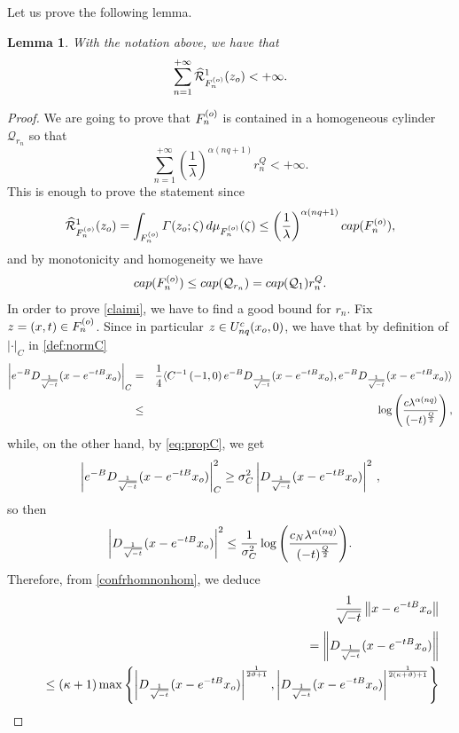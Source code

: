 \documentclass{amsart}
\newtheorem{lemma}[thm]{Lemma}
\numberwithin{equation}{section}
\def \balayage{{\widehat{\mathcal{R}}}}
\renewcommand{\Gamma}{\varGamma}
\begin{document}
{Let us prove the following lemma.
\begin{lemma}%
With the notation above, we have that
\[
\sum_{n=1}^{+\infty}{\balayage^1_{F_n^{( {\rm o})}}(z_{\rm o})}<+\infty.
\]
\end{lemma}
\begin{proof}
We are going to prove that $F_n^{( {\rm o})}$ is contained in a homogeneous cylinder $\mathcal{Q}_{r_n}$ so that
\begin{equation}\label{claimi}
\sum_{n=1}^{+\infty}{\left(\frac{1}{\lambda}\right)^{\alpha(nq+1)}r_n^Q}<+\infty.
\end{equation}
This is enough to prove the statement since
\[
\balayage^1_{F_n^{( {\rm o})}}(z_{\rm o})=\int_{F_n^{( {\rm o})}}{\Gamma(z_{\rm o};\zeta)\,\rm{d}\mu_{F_n^{( {\rm o})}}(\zeta)}\leq\left(\frac{1}{\lambda}\right)^{\alpha(nq+1)}\textup{cap} (F_n^{( {\rm o})}),
\]
and by monotonicity and homogeneity we have 
\[
\textup{cap} (F_n^{( {\rm o})})\leq \textup{cap} (\mathcal{Q}_{r_n})= \textup{cap} (\mathcal{Q}_{1}) r_n^Q.
\]
In order to prove \eqref{claimi}, we have to find a good bound for $r_n$. Fix $z=(x,t)\in F_n^{( {\rm o})}$. Since in particular $z\in U_{nq}^c(x_{\rm o},0)$, we have that by definition of $|\cdot|_C$ in \eqref{def:normC}
\begin{eqnarray*}
\left|e^{-B}D_{\frac{1}{\sqrt{-t}}}(x-e^{-t B}x_{\rm o})\right|_C & = &   \frac{1}{4}\langle C^{-1}\left(-1,0\right)e^{-B}D_{\frac{1}{\sqrt{-t}}}(x-e^{-tB}x_{\rm o}),e^{-B}D_{\frac{1}{\sqrt{-t}}}(x-e^{-tB}x_{\rm o})\rangle\notag\\
& \leq & 
\log{\left(\frac{c\lambda^{\alpha(nq)}}{(-t)^{\frac{Q}{2}}}\right)}\,,
\end{eqnarray*}
while, on the other hand, by \eqref{eq:propC}, we get
\[
    \left|e^{-B}D_{\frac{1}{\sqrt{-t}}}(x-e^{-tB}x_{\rm o})\right|_C^2 \geq  
 \sigma^2_C \left|D_{\frac{1}{\sqrt{-t}}}(x-e^{-tB}x_{\rm o})\right|^2\,,
\]
so then
\begin{equation}\label{boundM}
\left|D_{\frac{1}{\sqrt{-t}}}(x-e^{-tB}x_{\rm o})\right|^2\leq\frac{1}{\sigma^2_C }\log{\left(\frac{c_N\lambda^{\alpha(nq)}}{(-t)^{\frac{Q}{2}}}\right)}.
\end{equation} 
Therefore, from \eqref{confrhomnonhom}, we deduce
\begin{eqnarray*}
&& \frac{1}{\sqrt{-t}}\left\|x-e^{-tB}x_{\rm o}\right\|\\*[0.5ex]
&& \quad = \left\|D_{\frac{1}{\sqrt{-t}}}(x-e^{-tB}x_{\rm o})\right\|\\
&& \quad \leq  (\kappa+1)\max{\left\{\left|D_{\frac{1}{\sqrt{-t}}}(x-e^{-tB}x_{\rm o})\right|^\frac{1}{2\vartheta+1}, \left|D_{\frac{1}{\sqrt{-t}}}(x-e^{-tB}x_{\rm o})\right|^{\frac{1}{2(\kappa+\vartheta)+1}}\right\}}\\

\end{eqnarray*}
\end{proof}}
\end{document}
